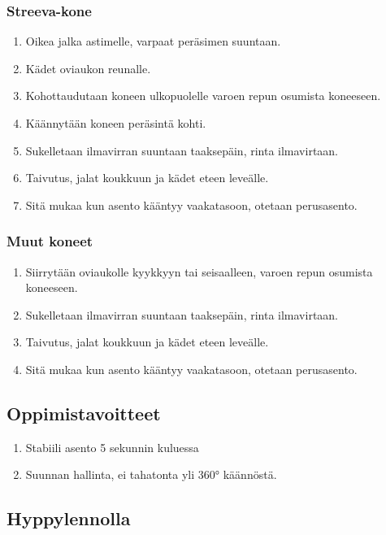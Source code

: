 \begin{multicols}{2}
\subsubsection{Streeva-kone}
\label{pl-peruskoulutuksen-suoritukset-streeva-kone}

\begin{enumerate}[label=\bfseries \arabic*)]
\item Oikea jalka astimelle, varpaat peräsimen suuntaan. 
\item Kädet oviaukon reunalle. 
\item Kohottaudutaan koneen ulkopuolelle varoen repun osumista koneeseen. 
\item Käännytään koneen peräsintä kohti. 
\item Sukelletaan ilmavirran suuntaan taaksepäin, rinta ilmavirtaan. 
\item Taivutus, jalat koukkuun ja kädet eteen leveälle. 
\item Sitä mukaa kun asento kääntyy vaakatasoon, otetaan perusasento. 
\end{enumerate}
\subsubsection{Muut koneet}
\label{pl-peruskoulutuksen-suoritukset-muut-koneet}

\begin{enumerate}[label=\bfseries \arabic*)]
\item Siirrytään oviaukolle kyykkyyn tai seisaalleen, varoen repun osumista koneeseen. 
\item Sukelletaan ilmavirran suuntaan taaksepäin, rinta ilmavirtaan. 
\item Taivutus, jalat koukkuun ja kädet eteen leveälle. 
\item Sitä mukaa kun asento kääntyy vaakatasoon, otetaan perusasento. 
\end{enumerate}
\subsection{ Oppimistavoitteet }
\label{pl-peruskoulutuksen-suoritukset-oppimistavoitteet}

\begin{enumerate}[label=\bfseries \arabic*)]
\item  Stabiili asento 5 sekunnin kuluessa 
\item  Suunnan hallinta, ei tahatonta yli 360° käännöstä. 
\end{enumerate}
\subsection{ Hyppylennolla }
\label{pl-peruskoulutuksen-suoritukset-hyppylennolla}


\end{multicols}
